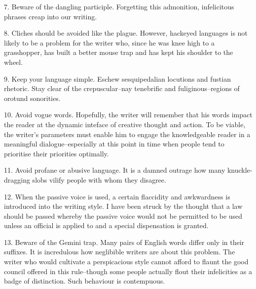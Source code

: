\documentclass[a4paper]{article}
\begin{document}
7. Beware of the dangling participle.  Forgetting this admonition, infelicitous phrases creap into our writing.

8.  Cliches should be avoided like the plague.  However, hackeyed languages is not likely to be a problem for the writer who, since he was knee high to a grasshopper, has built a better mouse trap and has kept his shoulder to the wheel.

9.  Keep your language simple.  Eschew sesquipedalian locutions and fustian rhetoric.  Stay clear of the crepuscular--nay tenebrific and fuliginous--regions of orotund sonorities.

10.  Avoid vogue words.  Hopefully, the writer will remember that his words impact the reader at the dynamic inteface of creative thought and action.  To be viable, the writer's parameters must enable him to engage the knowledgeable reader in a meaningful dialogue--especially at this point in time when people tend to prioritise their priorities optimally.

11. Avoid profane or abusive language.  It is a damned outrage how many knuckle-dragging slobs vilify people with whom they disagree.

12.  When the passive voice is used, a certain flaccidity and awkwardness is introduced into the writing style.  I have been struck by the thought that a law should be passed whereby the passive voice would not be permitted to be used unless an official is applied to and a special dispensation is granted.

13.  Beware of the Gemini trap.  Many pairs of English words differ only in their suffixes.  It is incredulous how neglibible writers are about this problem.  The writer who would cultivate a perspicacious style cannot afford to flaunt the good council  offered in this rule--though some people actually flout their infelicities as a badge of distinction.  Such behaviour is contempuous.
\end{document}
